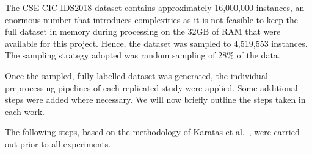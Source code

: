 The CSE-CIC-IDS2018 dataset contains approximately 16,000,000 instances, an
enormous number that introduces complexities as it is not feasible to keep the
full dataset in memory during processing on the 32GB of RAM that were available
for this project. Hence, the dataset was sampled to 4,519,553 instances. The
sampling strategy adopted was random sampling of 28\% of the data.

Once the sampled, fully labelled dataset was generated, the individual
preprocessing pipelines of each replicated study were applied. Some additional
steps were added where necessary. We will now briefly outline the steps taken
in each work.

The following steps, based on the methodology of Karatas et al.~\cite{Karatas},
were carried out prior to all experiments.

